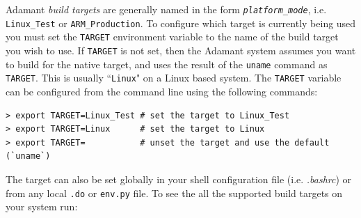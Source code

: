 Adamant \textit{build targets} are generally named in the form \texttt{\textit{platform}\_\textit{mode}}, i.e. \texttt{Linux\_Test} or \texttt{ARM\_Production}. To configure which target is currently being used you must set the \texttt{TARGET} environment variable to the name of the build target you wish to use. If \texttt{TARGET} is not set, then the Adamant system assumes you want to build for the native target, and uses the result of the \texttt{uname} command as \texttt{TARGET}. This is usually ``\texttt{Linux}" on a Linux based system. The \texttt{TARGET} variable can be configured from the command line using the following commands:

\vspace{5mm} %
\begin{verbatim}
> export TARGET=Linux_Test # set the target to Linux_Test 
> export TARGET=Linux      # set the target to Linux 
> export TARGET=           # unset the target and use the default (`uname`)
\end{verbatim}
\vspace{5mm} %

The target can also be set globally in your shell configuration file (i.e. \textit{.bashrc}) or from any local \texttt{.do} or \texttt{env.py} file. To see the all the supported build targets on your system run:

